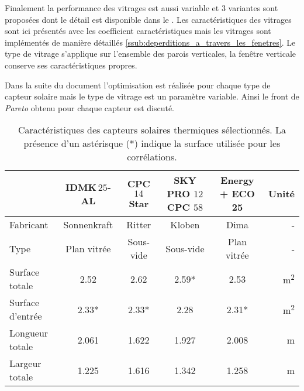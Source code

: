 Finalement la performance des vitrages est aussi variable et $3$ variantes sont proposées
dont le détail est disponible dans le . Les caractéristiques
des vitrages sont ici présentés avec les coefficient caractéristiques mais les vitrages
sont implémentés de manière détaillés \ref{ssub:deperditions_a_travers_les_fenetres}.
Le type de vitrage s’applique sur l’ensemble des parois verticales, la fenêtre verticale
conserve ses caractéristiques propres.

Dans la suite du document l’optimisation est réalisée pour chaque type de capteur solaire
mais le type de vitrage est un paramètre variable. Ainsi le front de \textit{Pareto}
obtenu pour chaque capteur est discuté.

\begin{table}
\centering
\caption{Caractéristiques des capteurs solaires thermiques sélectionnés. La présence d’un astérisque (*)
         indique la surface utilisée pour les corrélations.}
\label{tab:capteurs_specs_optimisation}
\begin{tabular}{l c c c c r}
    \toprule
                                 & IDMK\,$25$-AL              & CPC $14$ Star            & SKY PRO $12$ CPC $58$      & Energy + ECO 25         & Unité                       \\
    \midrule
    Fabricant                    & Sonnenkraft                & Ritter                   & Kloben                     & Dima                    & -                           \\
    Type                         & Plan vitrée                & Sous-vide                & Sous-vide                  & Plan vitrée             & -                           \\
    \addlinespace[\defaultaddspace]
    Surface totale               & \num{2.52}                 & \num{2.62}               & \num{2.59}*                & \num{2.53}              & \si{\metre\squared}                  \\
    Surface d’entrée             & \num{2.33}*                & \num{2.33}*              & \num{2.28}                 & \num{2.31}*              & \si{\metre\squared}                  \\
    Longueur totale              & \num{2.061}                & \num{1.622}              & \num{1.927}                & \num{2.008}             & \si{\metre}                  \\
    Largeur totale               & \num{1.225}                & \num{1.616}              & \num{1.342}                & \num{1.258}             & \si{\metre}                  \\

\end{tabular}
\end{table}
